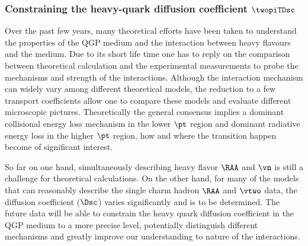 \subsubsection{Constraining the heavy-quark diffusion coefficient $\twopiTDsc$}
Over the past few years, many theoretical efforts have been taken to understand the properties of the QGP medium and the interaction between heavy flavours and the medium. Due to its short life time one has to reply on the comparison between theoretical calculation and the experimental measurements to probe the mechanisms and strength of the interactions. 
Although the interaction mechanism can widely vary among different theoretical models, the reduction to a few transport coefficients allow one to compare these models and evaluate different microscopic pictures. Theoretically the general consensus implies a dominant collisional energy loss mechanism in the lower $\pt$ region and dominant radiative energy loss in the higher $\pt$ region, how and where the transition happen become of significant interest.


So far on one hand, simultaneously describing heavy flavor  $\RAA$ and $\vn$ is still a challenge for theoretical calculations. On the other hand, for many of the models that can reasonably describe the single charm hadron $\RAA$ and $\vtwo$ data, the diffusion coefficient ($\Dsc$) varies significantly and is to be determined. The future data will be able to constrain the heavy quark diffusion coefficient in the QGP medium to a more precise level, potentially distinguish different mechanisms and greatly improve our understanding to nature of the interactions.


